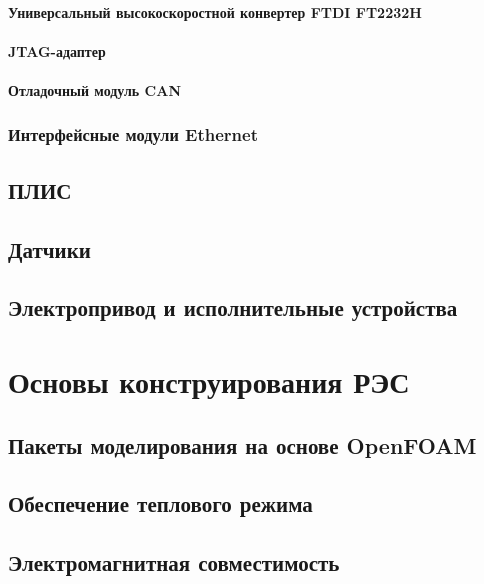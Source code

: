 \subsection{Универсальный высокоскоростной конвертер FTDI FT2232H}

\subsection{JTAG-адаптер}

\subsection{Отладочный модуль CAN}

\section{Интерфейсные модули Ethernet}

\chapter{ПЛИС}

\chapter{Датчики}

\chapter{Электропривод и исполнительные устройства}

\part{Основы конструирования РЭС}

\chapter{Пакеты моделирования на основе OpenFOAM}

\chapter{Обеспечение теплового режима}

\chapter{Электромагнитная совместимость}

